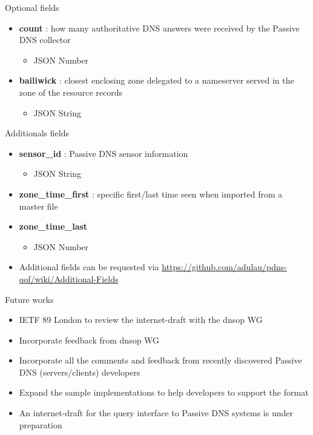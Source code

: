 \begin{frame}[t]{Optional fields}
\begin{itemize}
\item \textbf{count} : how many authoritative DNS answers were received by the Passive DNS collector
\begin{itemize}
\item JSON Number
\end{itemize}
\item \textbf{bailiwick} : closest enclosing zone delegated to a nameserver served in the zone of the resource records
\begin{itemize}
\item JSON String
\end{itemize}

\end{itemize}
\end{frame}

\begin{frame}[t]{Additionals fields}
\begin{itemize}
\item \textbf{sensor\_id} : Passive DNS sensor information
\begin{itemize}
\item JSON String
\end{itemize}
\item \textbf{zone\_time\_first} : specific first/last time seen when imported from a master file
\item \textbf{zone\_time\_last}
\begin{itemize}
\item JSON Number
\end{itemize}
\item Additional fields can be requested via \url{https://github.com/adulau/pdns-qof/wiki/Additional-Fields}
\end{itemize}
\end{frame}


\begin{frame}[t]{Future works}
\begin{itemize}
\item IETF 89 London to review the internet-draft with the dnsop WG
\item Incorporate feedback from dnsop WG
\item Incorporate all the comments and feedback from recently discovered Passive DNS (servers/clients) developers
\item Expand the sample implementations to help developers to support the format
\item An internet-draft for the query interface to Passive DNS systems is under preparation
\end{itemize}
\end{frame}

